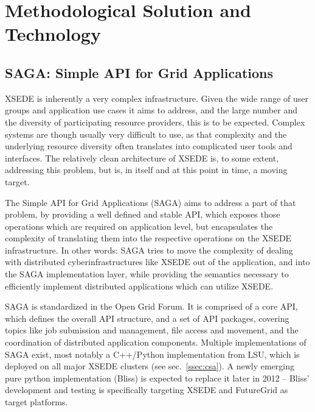 \documentclass{sig-alternate}
\begin{document}
\section{Methodological Solution and Technology}

\subsection{SAGA: Simple API for Grid Applications}
 \label{ssec:saga}

XSEDE is inherently a very complex infrastructure.  Given the wide
range of user groups and application use cases it aims to address,
and the large number and the diversity of participating resource
providers, this is to be expected.  Complex systems are though
usually very difficult to use, as that complexity and the underlying
resource diversity often translates into complicated user tools and
interfaces.  The relatively clean architecture of XSEDE is, to some
extent, addressing this problem, but is, in itself and at this point
in time, a moving target.

The Simple API for Grid Applications (SAGA) aims to address a part of
that problem, by providing a well defined and stable API, which
exposes those operations which are required on application level, but
encapsulates the complexity of translating them into the respective
operations on the XSEDE infrastructure.  In other words: SAGA tries
to move the complexity of dealing with distributed
cyberinfrastructures like XSEDE out of the application, and into the
SAGA implementation layer, while providing the semantics necessary to
efficiently implement distributed applications which can utilize
XSEDE.

SAGA is standardized in the Open Grid Forum.  It is comprised of a
core API, which defines the overall API structure, and a set of API
packages, covering topics like job submission and management, file
access and movement, and the coordination of distributed application
components.  Multiple implementations of SAGA exist, most notably a
C++/Python implementation from LSU, which is deployed on all major
XSEDE clusters (see sec.~\ref{ssec:csa}).  A newly emerging pure
python implementation (Bliss) is expected to replace it later in
2012 -- Bliss' development and testing is specifically targeting
XSEDE and FutureGrid as target platforms.
\end{document}

